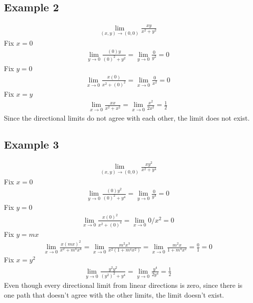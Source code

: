 \documentclass{article}
\theoremstyle{mytheoremstyle}
\theoremstyle{mytheoremstyle}
\theoremstyle{myproblemstyle}
\begin{document}
    \subsection*{Example 2}
    \begin{align*}
        \lim_{(x,y)\to (0,0)} \frac{xy}{x^2+y^2}
    \end{align*}
    Fix $x=0$
    \begin{align*}
        \lim_{y\to 0} \frac{(0)y}{(0)^2+y^2} = \lim_{y\to 0} \frac{0}{y^2} =  0
    \end{align*}
    Fix $y=0$
    \begin{align*}
        \lim_{x\to 0} \frac{x(0)}{x^2+(0)^2} = 
        \lim_{x\to 0} \frac{0}{x^2} = 0
    \end{align*}
    Fix $x=y$
    \begin{align*}
        \lim_{x\to 0} \frac{xx}{x^2+x^2} = \lim_{x\to 0} \frac{x^2}{2x^2} = \frac{1}{2}
    \end{align*}
    Since the directional limits do not agree with each other, the limit does
    not exist.

    \subsection*{Example 3}
    \begin{align*}
        \lim_{(x,y)\to (0,0)} \frac{xy^2}{x^2+y^4}
    \end{align*}
    Fix $x=0$
    \begin{align*}
        \lim_{y\to 0} \frac{(0)y^2}{(0)^2+y^4} = \lim_{y\to 0} \frac{0}{y^4} = 0
    \end{align*}
    Fix $y=0$
    \begin{align*}
        \lim_{x\to 0} \frac{x(0)^2}{x^2+(0)^4} = \lim_{x\to 0} 0/x^2 = 0
    \end{align*}
    Fix $y=mx$
    \begin{align*}
        \lim_{x\to 0} \frac{x(mx)^2}{x^2+m^4x^4}
        = \lim_{x\to 0} \frac{m^2x^3}{x^2(1+m^4x^2)}
        = \lim_{x\to 0} \frac{m^2x}{1+m^4x^2} = \frac{0}{1} = 0
    \end{align*}
    Fix $x=y^2$
    \begin{align*}
        \lim_{y\to 0} \frac{y^2y^2}{(y^2)^2+y^4} = \lim_{y\to 0} \frac{y^4}{2y^4} = \frac{1}{2}
    \end{align*}
    Even though every directional limit from linear directions is zero, since
    there is one path that doesn't agree with the other limits, the limit
    doesn't exist.
\end{document}
